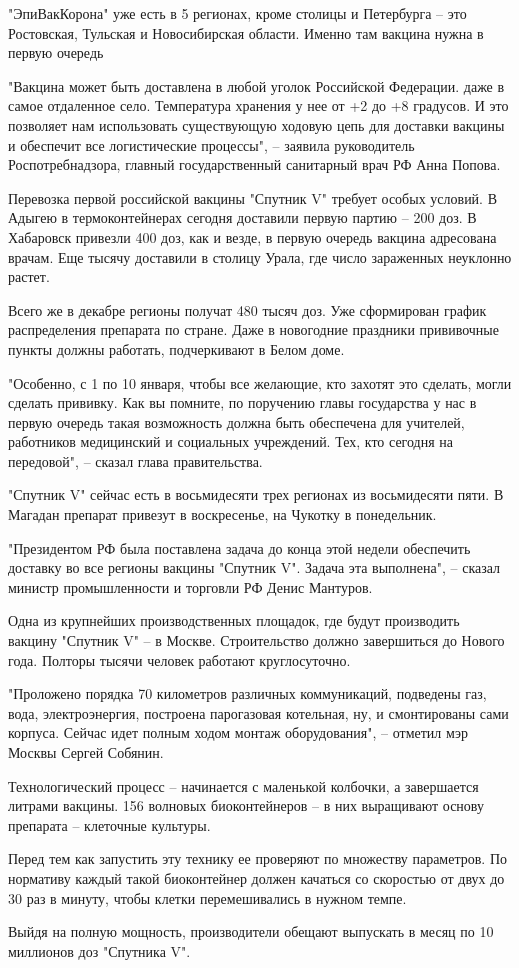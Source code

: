"ЭпиВакКорона" уже есть в 5 регионах, кроме столицы и Петербурга – это
Ростовская, Тульская и Новосибирская области. Именно там вакцина нужна в первую
очередь

"Вакцина может быть доставлена в любой уголок Российской Федерации. даже в
самое отдаленное село. Температура хранения у нее от +2 до +8 градусов. И это
позволяет нам использовать существующую ходовую цепь для доставки вакцины и
обеспечит все логистические процессы", – заявила руководитель Роспотребнадзора,
главный государственный санитарный врач РФ Анна Попова.

Перевозка первой российской вакцины "Спутник V" требует особых условий. В
Адыгею в термоконтейнерах сегодня доставили первую партию – 200 доз. В
Хабаровск привезли 400 доз, как и везде, в первую очередь вакцина адресована
врачам. Еще тысячу доставили в столицу Урала, где число зараженных неуклонно
растет.

Всего же в декабре регионы получат 480 тысяч доз. Уже сформирован график
распределения препарата по стране. Даже в новогодние праздники прививочные
пункты должны работать, подчеркивают в Белом доме.

"Особенно, с 1 по 10 января, чтобы все желающие, кто захотят это сделать, могли
сделать прививку. Как вы помните, по поручению главы государства у нас в первую
очередь такая возможность должна быть обеспечена для учителей, работников
медицинский и социальных учреждений. Тех, кто сегодня на передовой", – сказал
глава правительства.

"Спутник V" сейчас есть в восьмидесяти трех регионах из восьмидесяти пяти. В
Магадан препарат привезут в воскресенье, на Чукотку в понедельник.

"Президентом РФ была поставлена задача до конца этой недели обеспечить доставку
во все регионы вакцины "Спутник V". Задача эта выполнена", – сказал министр
промышленности и торговли РФ Денис Мантуров.

Одна из крупнейших производственных площадок, где будут производить вакцину
"Спутник V" – в Москве. Строительство должно завершиться до Нового года.
Полторы тысячи человек работают круглосуточно.

"Проложено порядка 70 километров различных коммуникаций, подведены газ, вода,
электроэнергия, построена парогазовая котельная, ну, и смонтированы сами
корпуса. Сейчас идет полным ходом монтаж оборудования", – отметил мэр Москвы
Сергей Собянин.

Технологический процесс – начинается с маленькой колбочки, а завершается
литрами вакцины. 156 волновых биоконтейнеров – в них выращивают основу
препарата – клеточные культуры.

Перед тем как запустить эту технику ее проверяют по множеству параметров. По
нормативу каждый такой биоконтейнер должен качаться со скоростью от двух до 30
раз в минуту, чтобы клетки перемешивались в нужном темпе.

Выйдя на полную мощность, производители обещают выпускать в месяц по 10
миллионов доз "Спутника V".
